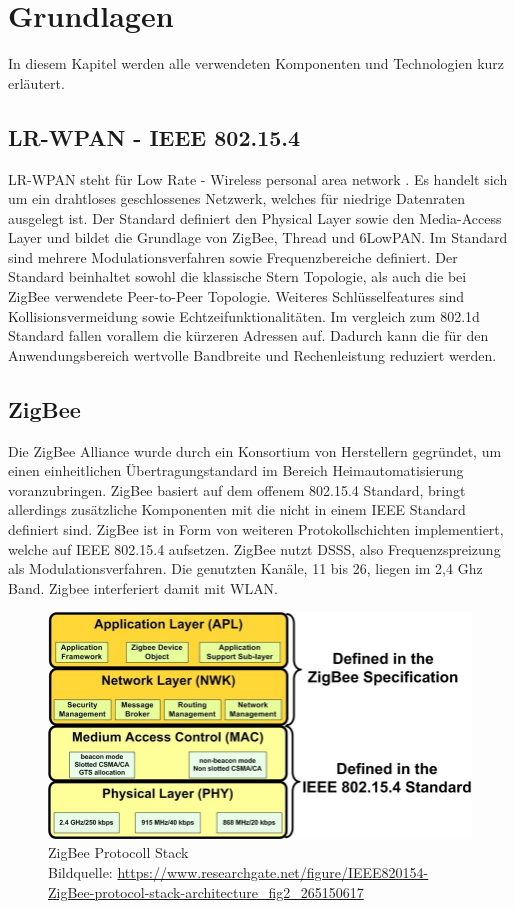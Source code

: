\chapter{Grundlagen}

In diesem Kapitel werden alle verwendeten Komponenten und Technologien kurz erläutert.

\section{LR-WPAN - IEEE 802.15.4}

LR-WPAN \cite{lrwpan} steht für \grqq Low Rate - Wireless personal area network \grqq{}. Es handelt sich um ein drahtloses geschlossenes Netzwerk, welches für 
niedrige Datenraten ausgelegt ist. Der Standard definiert den Physical Layer sowie den Media-Access Layer und bildet die Grundlage von ZigBee, Thread und 6LowPAN.
Im Standard sind mehrere Modulationsverfahren sowie Frequenzbereiche definiert. Der Standard beinhaltet sowohl die klassische Stern Topologie, als auch die bei 
ZigBee verwendete Peer-to-Peer Topologie. Weiteres Schlüsselfeatures sind Kollisionsvermeidung sowie Echtzeifunktionalitäten. Im vergleich zum 802.1d Standard 
fallen vorallem die kürzeren Adressen auf. Dadurch kann die für den Anwendungsbereich wertvolle Bandbreite und Rechenleistung reduziert werden. 

\section{ZigBee}

Die ZigBee Alliance wurde durch ein Konsortium von Herstellern gegründet, um einen einheitlichen Übertragungstandard
im Bereich Heimautomatisierung voranzubringen. ZigBee basiert auf dem offenem 802.15.4 Standard, bringt allerdings zusätzliche Komponenten mit die nicht in einem IEEE
Standard definiert sind.
ZigBee ist in Form von weiteren Protokollschichten implementiert, welche auf IEEE 802.15.4 aufsetzen. ZigBee nutzt DSSS, also Frequenzspreizung als Modulationsverfahren.
Die genutzten Kanäle, 11 bis 26, liegen im 2,4 Ghz Band. Zigbee interferiert damit mit WLAN.

\begin{figure}[H]
  \centering
  \includegraphics[width=1\textwidth]{media/Zigbee Stack.jpg}
  \caption{ZigBee Protocoll Stack \\ Bildquelle: \url{https://www.researchgate.net/figure/IEEE820154-ZigBee-protocol-stack-architecture_fig2_265150617}}
\end{figure}

